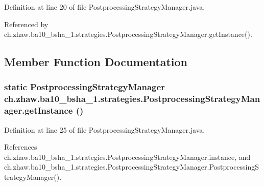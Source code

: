 Definition at line 20 of file PostprocessingStrategyManager.java.

Referenced by ch.zhaw.ba10\_\-bsha\_\-1.strategies.PostprocessingStrategyManager.getInstance().

\subsection{Member Function Documentation}
\hypertarget{classch_1_1zhaw_1_1ba10__bsha__1_1_1strategies_1_1PostprocessingStrategyManager_a3c81006dedcd5201183eefdcc9c84b45}{
\subsubsection[{getInstance}]{\setlength{\rightskip}{0pt plus 5cm}static {\bf PostprocessingStrategyManager} ch.zhaw.ba10\_\-bsha\_\-1.strategies.PostprocessingStrategyManager.getInstance ()}}
\label{classch_1_1zhaw_1_1ba10__bsha__1_1_1strategies_1_1PostprocessingStrategyManager_a3c81006dedcd5201183eefdcc9c84b45}


Definition at line 25 of file PostprocessingStrategyManager.java.

References ch.zhaw.ba10\_\-bsha\_\-1.strategies.PostprocessingStrategyManager.instance, and ch.zhaw.ba10\_\-bsha\_\-1.strategies.PostprocessingStrategyManager.PostprocessingStrategyManager().


